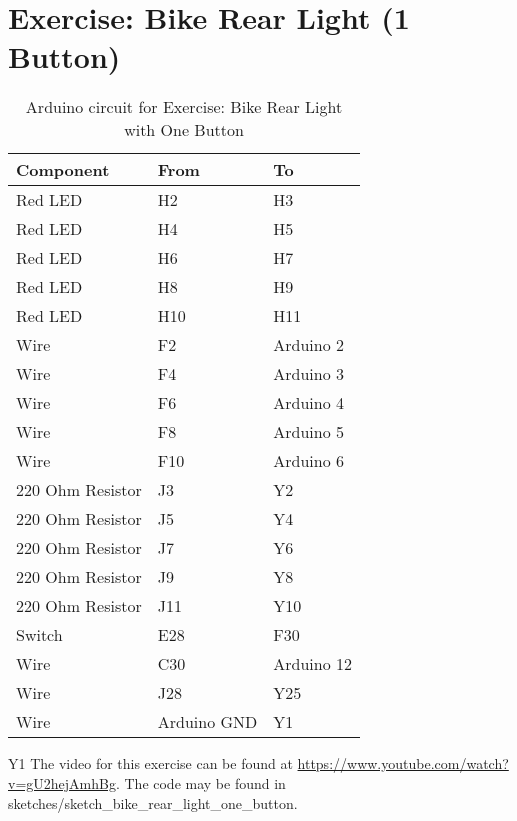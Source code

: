 \part*{Exercise: Bike Rear Light (1 Button)}
\begin{table}[H]
	\centering
	\caption{Arduino circuit for Exercise: Bike Rear Light with One Button}
	\begin{tabular}{|l|l|l|}
		\hline
		Component        & From        & To         \\ \hline
		Red LED          & H2          & H3         \\ \hline
		Red LED          & H4          & H5         \\ \hline
		Red LED          & H6          & H7         \\ \hline
		Red LED          & H8          & H9         \\ \hline
		Red LED          & H10         & H11        \\ \hline
		Wire             & F2          & Arduino 2  \\ \hline
		Wire             & F4          & Arduino 3  \\ \hline
		Wire             & F6          & Arduino 4  \\ \hline
		Wire             & F8          & Arduino 5  \\ \hline
		Wire             & F10         & Arduino 6  \\ \hline
		220 Ohm Resistor & J3          & Y2         \\ \hline
		220 Ohm Resistor & J5          & Y4         \\ \hline
		220 Ohm Resistor & J7          & Y6         \\ \hline
		220 Ohm Resistor & J9          & Y8         \\ \hline
		220 Ohm Resistor & J11         & Y10        \\ \hline
		Switch           & E28         & F30        \\ \hline
		Wire             & C30         & Arduino 12 \\ \hline
		Wire             & J28         & Y25        \\ \hline
		Wire             & Arduino GND & Y1         \\ \hline
	\end{tabular}
\end{table}Y1
The video for this exercise can be found at \url{https://www.youtube.com/watch?v=gU2hejAmhBg}. The code may be found in sketches/sketch\_bike\_rear\_light\_one\_button.